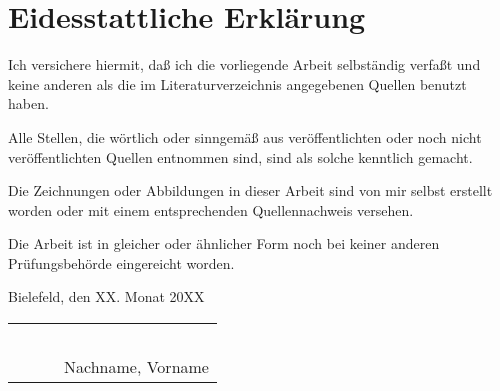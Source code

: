 

\chapter{Eidesstattliche Erklärung}

  Ich versichere hiermit, daß ich die vorliegende Arbeit selbständig verfaßt und keine anderen als die im Literaturverzeichnis angegebenen Quellen benutzt haben.

  Alle Stellen, die wörtlich oder sinngemäß aus veröﬀentlichten oder noch nicht veröﬀentlichten Quellen entnommen sind, sind als solche kenntlich gemacht.

  Die Zeichnungen oder Abbildungen in dieser Arbeit sind von mir selbst erstellt worden oder mit einem entsprechenden Quellennachweis versehen.

  Die Arbeit ist in gleicher oder ähnlicher Form noch bei keiner anderen Prüfungsbehörde eingereicht worden.

  Bielefeld, den XX. Monat 20XX

  \vspace*{1.5\baselineskip}
  
  \begin{table}[ht!]
    \begin{center}
      \begin{tabular}{p{120pt}p{50pt}p{120pt}}
        ~ & ~ & ~\\ \cline{3-3}
        ~ & ~ & Nachname, Vorname\\
      \end{tabular}
    \end{center}
  \end{table}

